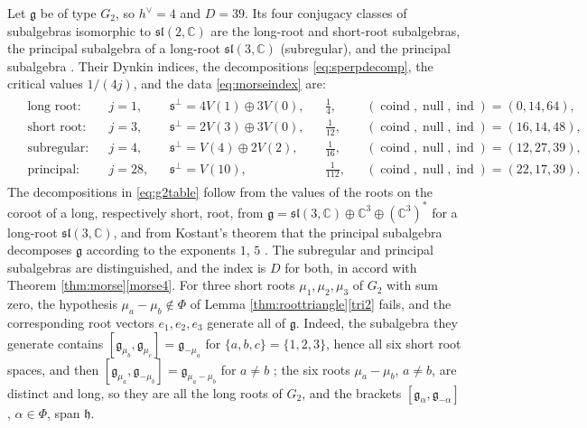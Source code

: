 \documentclass[leqno,10pt]{amsart}
\theoremstyle{definition}
\numberwithin{equation}{section}
\newcommand{\h}{\mathfrak{h}}
\newcommand{\al}{\alpha}
\newcommand{\sll}{\mathfrak{sl}}
\newcommand{\g}{\mathfrak{g}}
\newcommand{\com}{\mathbb C}
\newcommand{\hv}{h^\vee}
\newcommand{\subs}{\mathfrak{s}}
\begin{document}
\begin{example}\label{ex:g2}
Let $\g$ be of type $G_{2}$, so $\hv = 4$ and $D = 39$. Its four conjugacy classes of subalgebras isomorphic to $\sll(2, \com)$ are the long-root and short-root subalgebras, the principal subalgebra of a long-root $\sll(3, \com)$ (subregular), and the principal subalgebra \cite{Collingwood-McGovern, Dynkin-semisimplesubalgebras}. Their Dynkin indices, the decompositions \eqref{eq:sperpdecomp}, the critical values $1/(4j)$, and the data \eqref{eq:morseindex} are:
\begin{align}\label{eq:g2table}
\begin{aligned}
&\text{long root:} && j = 1, && \subs^{\perp} = 4V(1) \oplus 3V(0), && \tfrac{1}{4}, && (\operatorname{coind}, \operatorname{null}, \operatorname{ind}) = (0, 14, 64),\\
&\text{short root:} && j = 3, && \subs^{\perp} = 2V(3) \oplus 3V(0), && \tfrac{1}{12}, && (\operatorname{coind}, \operatorname{null}, \operatorname{ind}) = (16, 14, 48),\\
&\text{subregular:} && j = 4, && \subs^{\perp} = V(4) \oplus 2V(2), && \tfrac{1}{16}, && (\operatorname{coind}, \operatorname{null}, \operatorname{ind}) = (12, 27, 39),\\
&\text{principal:} && j = 28, && \subs^{\perp} = V(10), && \tfrac{1}{112}, && (\operatorname{coind}, \operatorname{null}, \operatorname{ind}) = (22, 17, 39).
\end{aligned}
\end{align}
The decompositions in \eqref{eq:g2table} follow from the values of the roots on the coroot of a long, respectively short, root, from $\g = \sll(3, \com) \oplus \com^{3} \oplus (\com^{3})^{\ast}$ for a long-root $\sll(3, \com)$, and from Kostant's theorem that the principal subalgebra decomposes $\g$ according to the exponents $1$, $5$ \cite{Kostant-triples}. The subregular and principal subalgebras are distinguished, and the index is $D$ for both, in accord with Theorem \ref{thm:morse}\ref{morse4}. For three short roots $\mu_{1}, \mu_{2}, \mu_{3}$ of $G_{2}$ with sum zero, the hypothesis $\mu_{a} - \mu_{b} \notin \Phi$ of Lemma \ref{thm:roottriangle}\ref{tri2} fails, and the corresponding root vectors $e_{1}, e_{2}, e_{3}$ generate all of $\g$. Indeed, the subalgebra they generate contains $[\g_{\mu_{b}}, \g_{\mu_{c}}] = \g_{-\mu_{a}}$ for $\{a, b, c\} = \{1, 2, 3\}$, hence all six short root spaces, and then $[\g_{\mu_{a}}, \g_{-\mu_{b}}] = \g_{\mu_{a} - \mu_{b}}$ for $a \neq b$ \cite[Proposition~8.4]{Humphreys}; the six roots $\mu_{a} - \mu_{b}$, $a \neq b$, are distinct and long, so they are all the long roots of $G_{2}$, and the brackets $[\g_{\al}, \g_{-\al}]$, $\al \in \Phi$, span $\h$.
\end{example}
\end{document}
